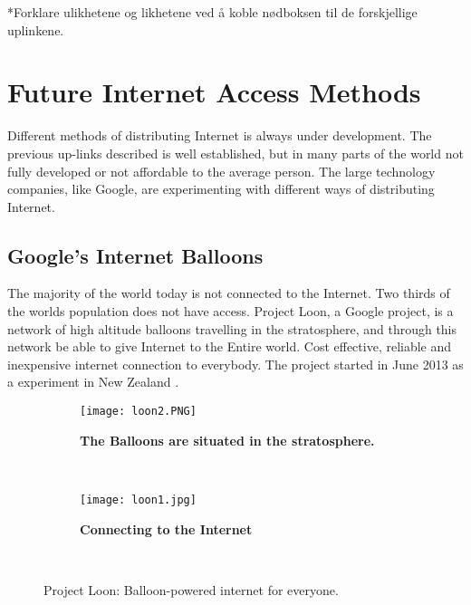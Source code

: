 *Forklare ulikhetene og likhetene ved å koble nødboksen til de forskjellige uplinkene. 

\section{Future Internet Access Methods}
Different methods of distributing Internet is always under development. The previous up-links described is well established, but in many parts of the world not fully developed or not affordable to the average person. The large technology companies, like Google, are experimenting with different ways of distributing Internet. 

\subsection{Google's Internet Balloons}
The majority of the world today is not connected to the Internet. Two thirds of the worlds population does not have access. Project Loon, a Google project, is a network of high altitude balloons travelling in the stratosphere, and through this network be able to give Internet to the Entire world. Cost effective, reliable and inexpensive internet connection to everybody. The project started in June 2013 as a experiment in New Zealand \cite{loon}. 

\begin{figure}
        \centering
        \begin{subfigure}[t]{0.43\textwidth}
                \texttt{[image: loon2.PNG]}
                \caption[The Balloons are situated in the stratosphere]{\textbf{The Balloons are situated in the stratosphere.}} 
                \label{fig:loonStratosphere}
        \end{subfigure}%
        ~ %
        \begin{subfigure}[t]{0.415\textwidth}
                \texttt{[image: loon1.jpg]}
               \caption[Connecting to the Internet]							{\textbf{Connecting to the Internet}} 
                \label{fig:loonConnect}
        \end{subfigure}
        ~ %
        \caption{Project Loon: Balloon-powered internet for everyone.}\label{fig:loon}
\end{figure}

